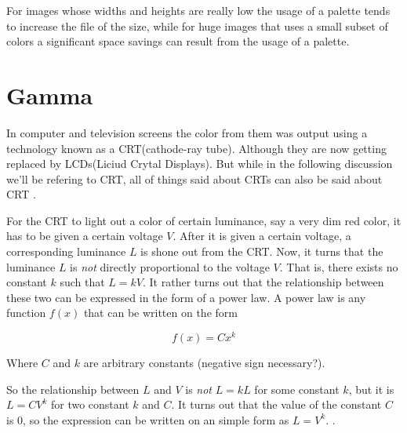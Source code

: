For images whose widths and heights are really low the usage of a
palette tends to increase the file of the size, while for huge images
that uses a small subset of colors a significant space savings can
result from the usage of a palette.

\section{Gamma}

\cite{roelofs99:_png}
\cite{boutel:_png_portab_networ_graph_specif_version11}
\cite{boutel:_png_portab_networ_graph_specif_version1}
\cite{boutel:_png_portab_networ_graph_specif_version12}
\cite{Pascale2003_ReviewRGBColourSpaces}
\cite{srgb}

\cite{lilley:_not_just_decor}

\cite{motta1991analytical_crt}

\cite{poynton2003digital}

In computer and television screens the color from them was output
using a technology known as a CRT(cathode-ray tube). Although they are
now getting replaced by LCDs(Liciud Crytal Displays). But while in the
following discussion we'll be refering to CRT, all of things said
about CRTs can also be said about CRT
\cite{hearn1997computer_graphics,roelofs99:_png}.

For the CRT to light out a color of certain luminance, say a very dim
red color, it has to be given a certain voltage $V$. After it is given
a certain voltage, a corresponding luminance $L$ is shone out from the
CRT. Now, it turns that the luminance $L$ is \textit{not} directly
proportional to the voltage $V$. That is, there exists no constant $k$
such that $L = kV$. It rather turns out that the relationship between
these two can be expressed in the form of a power law. A power law is
any function $f(x)$ that can be written on the form

\begin{equation*}
  f(x) = Cx^k
\end{equation*}

Where $C$ and $k$ are arbitrary constants (negative sign necessary?)\cite{newman05power,easley2010networks_powerlaw}.

So the relationship between $L$ and $V$ is \textit{not} $L = kL$ for
some constant $k$, but it is $L = CV^k$ for two constant $k$ and
$C$. It turns out that the value of the constant $C$ is $0$, so the
expression can be written on an simple form as $L =
V^k$. \cite{motta1991analytical_crt,Pascale2003_ReviewRGBColourSpaces,boutel:_png_portab_networ_graph_specif_version1,boutel:_png_portab_networ_graph_specif_version11,boutel:_png_portab_networ_graph_specif_version12,roelofs99:_png}.

